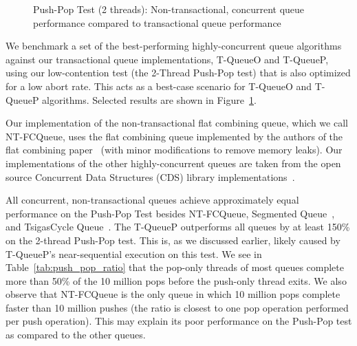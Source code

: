 \begin{figure}[ht!]
    \centering
	\begin{minipage}{0.75\textwidth}
	\end{minipage}
    \caption{Push-Pop Test (2 threads): Non-transactional, concurrent queue performance compared to transactional queue performance}
    \label{fig:ntqs_pp}
\end{figure}

We benchmark a set of the best-performing highly-concurrent queue algorithms against our transactional queue implementations, T-QueueO and T-QueueP, using our low-contention test (the 2-Thread Push-Pop test) that is also optimized for a low abort rate. This acts as a best-case scenario for T-QueueO and T-QueueP algorithms. Selected results are shown in Figure~\ref{fig:ntqs_pp}.

Our implementation of the non-transactional flat combining queue, which we call NT-FCQueue, uses the flat combining queue implemented by the authors of the flat combining paper~\cite{flatcombining} (with minor modifications to remove memory leaks). Our implementations of the other highly-concurrent queues are taken from the open source Concurrent Data Structures (CDS) library implementations~\cite{libcds}. 

All concurrent, non-transactional queues achieve approximately equal performance on the Push-Pop Test besides NT-FCQueue, Segmented Queue~\cite{queue4}, and TsigasCycle Queue~\cite{queue5}. 
The T-QueueP outperforms all queues by at least 150\% on the 2-thread Push-Pop test. This is, as we discussed earlier, likely caused by T-QueueP's near-sequential execution on this test. We see in Table~\ref{tab:push_pop_ratio} that the pop-only threads of most queues complete more than 50\% of the 10 million pops before the push-only thread exits.
We also observe that NT-FCQueue is the only queue in which 10 million pops complete faster than 10 million pushes (the ratio is closest to one pop operation performed per push operation). This may explain its poor performance on the Push-Pop test as compared to the other queues.

